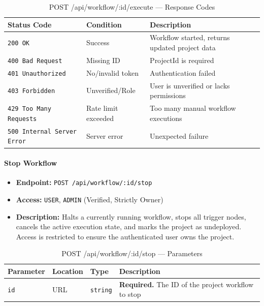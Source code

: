 \begin{table}[H]
\centering
\renewcommand{\arraystretch}{1.3}
\begin{tabularx}{\textwidth}{|l|l|X|}
\hline
\textbf{Status Code} & \textbf{Condition} & \textbf{Description} \\
\hline
\texttt{200 OK}           & Success              & Workflow started, returns updated project data \\
\hline
\texttt{400 Bad Request}  & Missing ID           & ProjectId is required \\
\hline
\texttt{401 Unauthorized} & No/invalid token     & Authentication failed \\
\hline
\texttt{403 Forbidden}    & Unverified/Role      & User is unverified or lacks permissions \\
\hline
\texttt{429 Too Many Requests} & Rate limit exceeded & Too many manual workflow executions \\
\hline
\texttt{500 Internal Server Error} & Server error & Unexpected failure \\
\hline
\end{tabularx}
\caption{POST /api/workflow/:id/execute — Response Codes}
\label{tab:execute-workflow-responses}
\end{table}
\FloatBarrier

\paragraph{Stop Workflow}
\label{subsubsec:stop-workflow}

\begin{itemize}
  \item \textbf{Endpoint:} \texttt{POST /api/workflow/:id/stop}
  \item \textbf{Access:} \texttt{USER}, \texttt{ADMIN} (Verified, Strictly Owner)
  \item \textbf{Description:} Halts a currently running workflow, stops all trigger nodes, cancels the active execution state, and marks the project as undeployed. Access is restricted to ensure the authenticated user owns the project.
\end{itemize}

\begin{table}[H]
\centering
\renewcommand{\arraystretch}{1.3}
\begin{tabularx}{\textwidth}{|l|l|l|X|}
\hline
\textbf{Parameter} & \textbf{Location} & \textbf{Type} & \textbf{Description} \\
\hline
\texttt{id} & URL & \texttt{string} & \textbf{Required.} The ID of the project workflow to stop \\
\hline
\end{tabularx}
\caption{POST /api/workflow/:id/stop — Parameters}
\label{tab:stop-workflow-params}
\end{table}

